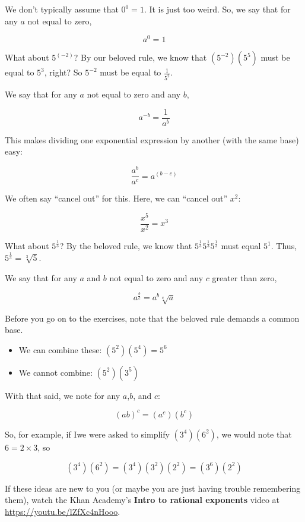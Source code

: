 We don't typically assume that $0^0 = 1$. It is just too
weird. So, we say that for any $a$ not equal to zero,

$$a^0 = 1$$

What about $5^{(-2)}$?  By our beloved rule, we know that
$\left(5^{-2}\right)\left(5^5\right)$ must be equal to $5^3$, right?
So $5^{-2}$ must be equal to $\frac{1}{5^2}$.

We say that for any $a$ not equal to zero and any $b$,

$$a^{-b} = \frac{1}{a^{b}}$$

This makes dividing one exponential expression by another (with the same base) easy:

$$\frac{a^b}{a^c} = a^{(b-c)}$$

We often say ``cancel out'' for this. Here, we can ``cancel out'' $x^2$:

$$\frac{x^5}{x^2} = x^3$$

What about $5^{\frac{1}{3}}$? By the beloved rule, we know that $5^{\frac{1}{3}}5^{\frac{1}{3}}5^{\frac{1}{3}}$ must equal $5^1$. Thus, $5^{\frac{1}{3}} = \sqrt[3]{5}$.

We say that for any $a$ and $b$ not equal to zero and any $c$ greater than zero,

$$a^{\frac{b}{c}} = a^b \sqrt[c]{a}$$

Before you go on to the exercises, note that the beloved rule demands a common base.
\begin{itemize}
\item We can combine these: $\left(5^2\right)\left(5^4\right) = 5^6$
\item We cannot combine: $\left(5^2\right)\left(3^5\right)$
\end{itemize}

With that said, we note for any $a$,$b$, and $c$:

$$\left(ab\right)^c = \left(a^c\right) \left(b^c\right)$$

So, for example, if Iwe were asked to simplify
$\left(3^4\right)\left(6^2\right)$, we would note that $6 = 2 \times
3$, so

$$\left(3^4\right)\left(6^2\right) = \left(3^4\right)\left(3^2\right)\left(2^2\right)  = \left(3^6\right)\left(2^2\right)$$


If these ideas are new to you (or maybe you are just having trouble remembering them),
watch the Khan Academy's \textbf{Intro to rational exponents} video at
\url{https://youtu.be/lZfXc4nHooo}.

